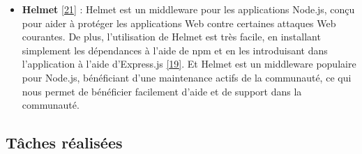 \documentclass[12pt]{article}
\begin{document}
\begin{itemize}
            \item
                  \textbf{Helmet} \protect\hyperlink{ref-helmet}{{[}21{]}} : Helmet est
                  un middleware pour les applications Node.js, conçu pour aider à
                  protéger les applications Web contre certaines attaques Web courantes.
                  De plus, l'utilisation de Helmet est très facile, en installant
                  simplement les dépendances à l'aide de npm et en les introduisant dans
                  l'application à l'aide d'Express.js
                  \protect\hyperlink{ref-Express_js}{{[}19{]}}. Et Helmet est un
                  middleware populaire pour Node.js, bénéficiant d'une maintenance
                  actifs de la communauté, ce qui nous permet de bénéficier facilement
                  d'aide et de support dans la communauté.
      \end{itemize}

      \hypertarget{tuxe2ches-ruxe9alisuxe9es}{%
            \subsection{Tâches réalisées}\label{tuxe2ches-ruxe9alisuxe9es}}
\end{document}
